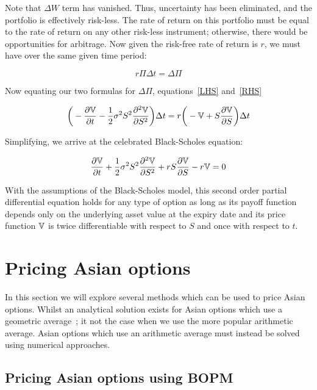 Note that \(\Delta W \) term has vanished. Thus, uncertainty has been eliminated, and the portfolio is effectively risk-less. The rate of return on this portfolio must be equal to the rate of return on any other risk-less instrument; otherwise, there would be opportunities for arbitrage. Now given the risk-free rate of return is \(r \), we must have over the same given time period:

\begin{equation}\label{RHS}
    r\Pi \Delta t = \Delta \Pi
\end{equation}

Now equating our two formulas for \(\Delta \Pi \), equations~\eqref{LHS} and~\eqref{RHS}

\begin{equation*}
    \bigg(-\frac{\partial \mathbb{V}}{\partial t} - \frac{1}{2}\sigma^2S^2\frac{\partial^2\mathbb{V}}{\partial S^2}\bigg)\Delta t = r\bigg(-\mathbb{V}+S\frac{\partial \mathbb{V}}{\partial S}\bigg)\Delta t
\end{equation*}

Simplifying, we arrive at the celebrated Black-Scholes equation:

\begin{equation*}
    \frac{\partial \mathbb{V}}{\partial t} + \frac{1}{2}\sigma^2S^2\frac{\partial^2\mathbb{V}}{\partial S^2} + rS\frac{\partial \mathbb{V}}{\partial S} - r\mathbb{V} = 0
\end{equation*}

With the assumptions of the Black-Scholes model, this second order partial differential equation holds for any type of option as long as its payoff function depends only on the underlying asset value at the expiry date and its price function \(\mathbb{V} \) is twice differentiable with respect to \(S \) and once with respect to \(t \).

\section{Pricing Asian options}\label{subsec: Asian Models}

In this section we will explore several methods which can be used to price Asian options. Whilst an analytical solution exists for Asian options which use a geometric average~\cite{zhang1997exotic}; it not the case when we use the more popular arithmetic average. Asian options which use an arithmetic average must instead be solved using numerical approaches.

\subsection{Pricing Asian options using BOPM}


